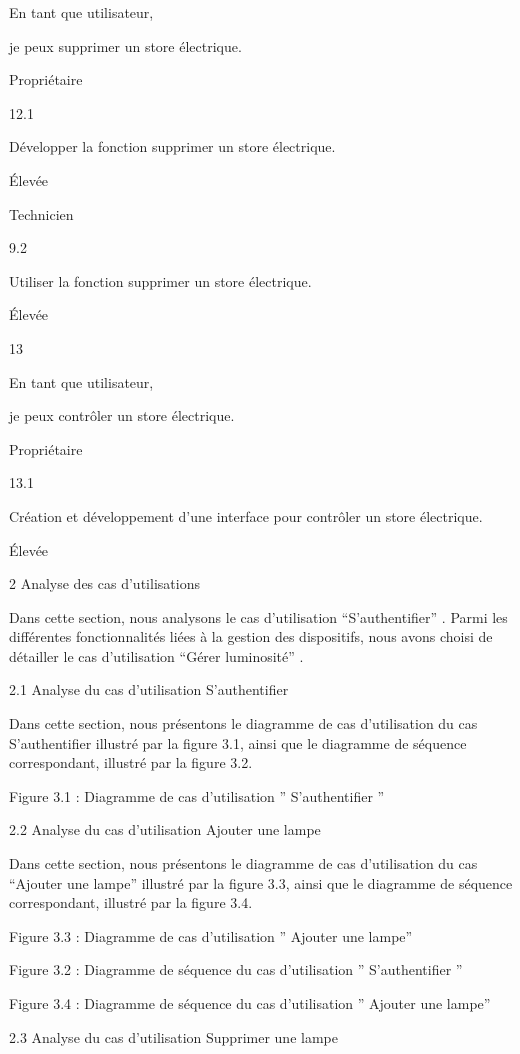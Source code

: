 \documentclass{article}
\begin{document}
En tant que utilisateur,

je peux supprimer  un store électrique.

Propriétaire

12.1

Développer la fonction supprimer  un store électrique.

Élevée

Technicien

9.2

Utiliser la fonction   supprimer  un store électrique.

Élevée

13

En tant que utilisateur,

je peux contrôler   un store électrique.

Propriétaire

13.1

Création et développement d’une interface pour  contrôler   un store électrique.

Élevée

2 Analyse des cas d’utilisations 

Dans cette section, nous analysons le cas d’utilisation “S’authentifier” . Parmi les différentes fonctionnalités liées à la gestion des dispositifs, nous avons choisi de détailler le cas d’utilisation “Gérer  luminosité” .

2.1 Analyse du cas d’utilisation S’authentifier

Dans cette section, nous présentons le diagramme de cas d'utilisation du cas  S’authentifier illustré par la figure 3.1, ainsi que le diagramme de séquence correspondant, illustré par la figure 3.2.

Figure 3.1 : Diagramme de cas d’utilisation ” S’authentifier ”

2.2 Analyse du cas d’utilisation Ajouter une lampe

Dans cette section, nous présentons le diagramme de cas d'utilisation du cas “Ajouter une lampe”  illustré par la figure 3.3, ainsi que le diagramme de séquence correspondant, illustré par la figure 3.4.

Figure 3.3 : Diagramme de cas d’utilisation ” Ajouter une lampe”

Figure 3.2 : Diagramme de séquence du cas d’utilisation ” S’authentifier ”

Figure 3.4 : Diagramme de séquence du cas d’utilisation ” Ajouter une lampe”

2.3 Analyse du cas d’utilisation Supprimer une lampe
\end{document}
